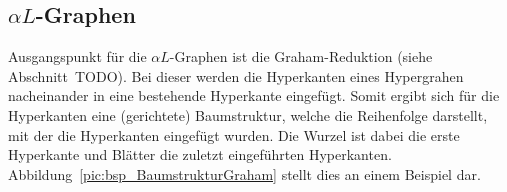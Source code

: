 \subsection{$\alpha L$-Graphen}
Ausgangspunkt für die $\alpha L$-Graphen ist die Graham-Reduktion (siehe Abschnitt~TODO). Bei dieser werden die Hyperkanten eines Hypergrahen nacheinander in eine bestehende Hyperkante eingefügt. Somit ergibt sich für die Hyperkanten eine (gerichtete) Baumstruktur, welche die Reihenfolge darstellt, mit der die Hyperkanten eingefügt wurden. Die Wurzel ist dabei die erste Hyperkante und Blätter die zuletzt eingeführten Hyperkanten. Abbildung~\ref{pic:bsp_BaumstrukturGraham} stellt dies an einem Beispiel dar.
%
%            
%            
%            
%                
%                
%                
%                
%                
%            
